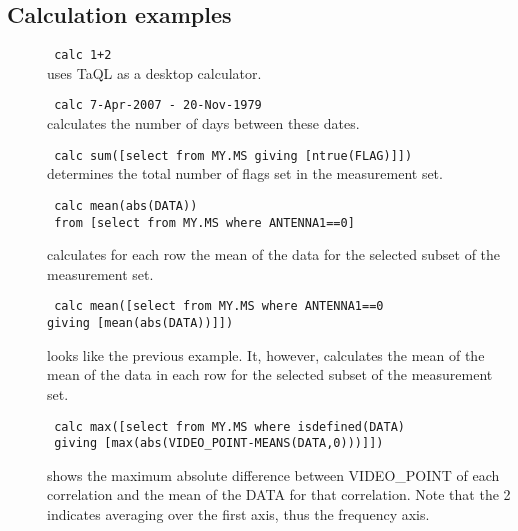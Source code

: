 \subsection{\label{TAQL:CALCEXAMPLES}Calculation examples}
\begin{description}
  \item[] \texttt{ calc 1+2 }
      \\uses TaQL as a desktop calculator.

  \item[] \texttt{ calc 7-Apr-2007 - 20-Nov-1979 }
      \\calculates the number of days between these dates.

  \item[] \texttt{ calc sum([select from MY.MS giving [ntrue(FLAG)]]) }
      \\determines the total number of flags set in the measurement set.

  \item[] \texttt{ calc mean(abs(DATA)) }
          \\\texttt{ from [select from MY.MS where ANTENNA1==0] }

        calculates for each row the mean of the data for the selected
        subset of the measurement set.

  \item[] \texttt{ calc mean([select from MY.MS where ANTENNA1==0 }
          \\\texttt{giving [mean(abs(DATA))]]) }

        looks like the previous example. It, however, calculates the
        mean of the mean of the data in each row for the selected
        subset of the measurement set.

  \item[] \texttt{ calc max([select from MY.MS where isdefined(DATA) }
          \\\texttt{ giving [max(abs(VIDEO\_POINT-MEANS(DATA,0)))]]) }

        shows the maximum absolute difference between VIDEO\_POINT of
        each correlation and the mean of the DATA for that correlation.
        Note that the 2 indicates averaging over the first axis,
        thus the frequency axis.

\end{description}

